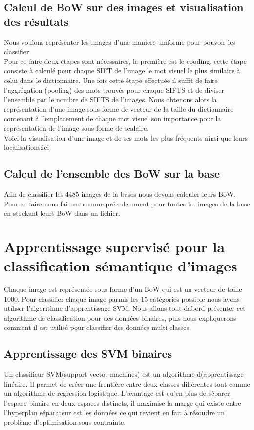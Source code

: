 \documentclass[a4paper]{article}
\begin{document}
\subsection{Calcul de BoW sur des images et visualisation des résultats}
Nous voulons représenter les images d'une manière uniforme pour pouvoir les classifier.\\
Pour ce faire deux étapes sont nécessaires, la première est le cooding, cette étape consiste à calculé pour chaque SIFT de l'image le mot visuel le plus similaire à celui dans le dictionnaire. Une fois cette étape effectuée il suffit de faire l'aggrégation (pooling) des mots trouvés pour chaque SIFTS et de diviser l'ensemble par le nombre de SIFTS de l'images. Nous obtenons alors la représentation d'une image sous forme de vecteur de la taille du dictionnaire contenant à l'emplacement de chaque mot visuel son importance pour la représentation de l'image sous forme de scalaire.\\
Voici la visualisation d'une image et de ses mots les plus fréquents ainsi que leurs localisations:ici

\subsection{Calcul de l’ensemble des BoW sur la base}
Afin de classifier les 4485 images de la bases nous devons calculer leurs BoW. Pour ce faire nous faisons comme précedemment pour toutes les images de la base en stockant leurs BoW dans un fichier.



\section{Apprentissage supervisé pour la classification sémantique d'images}
Chaque image est représentée sous forme d'un BoW qui est un vecteur de taille 1000. Pour classifier chaque image parmis les 15 catégories possible nous avons utiliser l'algorithme d'apprentissage SVM. Nous allons tout dabord présenter cet algorithme de classification pour des données binaires, puis nous expliquerons comment il est utilisé pour classifier des données multi-classes.
\subsection{Apprentissage des SVM binaires}
Un classifieur SVM(support vector machines) est un algorithme d(apprentissage linéaire. Il permet de créer une frontière entre deux classes différentes tout comme un algorithme de regression logistique. L'avantage est qu'en plus de séparer l'espace binaire en deux espaces distincts, il maximise la marge qui existe entre l'hyperplan séparateur est les données ce qui revient en fait à résoudre un problème d'optimisation sous contrainte.
\end{document}
